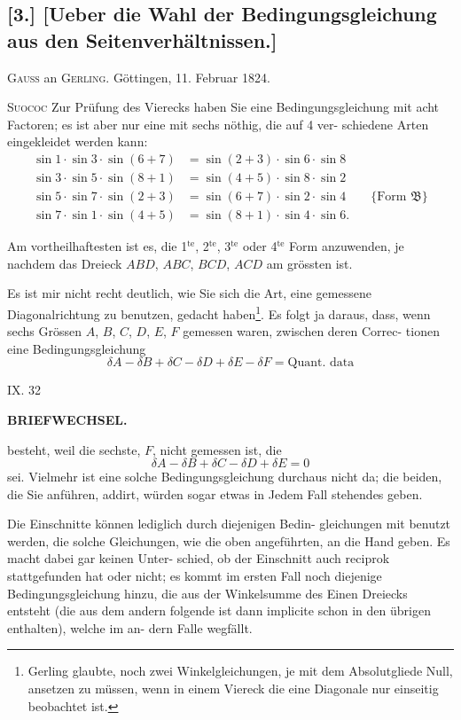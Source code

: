 \documentclass[12pt,a4paper]{article}
\theoremstyle{plain}
\theoremstyle{definition}
\theoremstyle{remark}
\begin{document}
\subsection*{[3.] [Ueber die Wahl der Bedingungsgleichung aus den Seitenverh\"altnissen.]}

\textsc{Gauss} an \textsc{Gerling}. G\"ottingen, 11. Februar 1824.

\medskip

\textsc{Suococ} Zur Pr\"ufung des Vierecks haben Sie eine Bedingungsgleichung
mit acht Factoren; es ist aber nur eine mit sechs n\"othig, die auf 4 ver-
schiedene Arten eingekleidet werden kann:
\begin{align*}
\sin 1 \cdot \sin 3 \cdot \sin(6 + 7) &= \sin(2 + 3) \cdot \sin 6 \cdot \sin 8 \\
\sin 3 \cdot \sin 5 \cdot \sin(8 + 1) &= \sin(4 + 5) \cdot \sin 8 \cdot \sin 2 \\
\sin 5 \cdot \sin 7 \cdot \sin(2 + 3) &= \sin(6 + 7) \cdot \sin 2 \cdot \sin 4 \qquad \{\text{Form }\mathfrak{B}\} \\
\sin 7 \cdot \sin 1 \cdot \sin(4 + 5) &= \sin(8 + 1) \cdot \sin 4 \cdot \sin 6.
\end{align*}

Am vortheilhaftesten ist es, die 1$^{\text{te}}$, 2$^{\text{te}}$, 3$^{\text{te}}$ oder 4$^{\text{te}}$ Form anzuwenden,
je nachdem das Dreieck $ABD$, $ABC$, $BCD$, $ACD$ am gr\"ossten ist.

Es ist mir nicht recht deutlich, wie Sie sich die Art, eine gemessene
Diagonalrichtung zu benutzen, gedacht haben\footnote{Gerling glaubte, noch zwei Winkelgleichungen, je mit dem Absolutgliede Null, ansetzen zu
m\"ussen, wenn in einem Viereck die eine Diagonale nur einseitig beobachtet ist.}.
Es folgt ja daraus, dass,
wenn sechs Gr\"ossen $A$, $B$, $C$, $D$, $E$, $F$ gemessen waren, zwischen deren Correc-
tionen eine Bedingungsgleichung
\[
\delta A - \delta B + \delta C - \delta D + \delta E - \delta F = \text{Quant. data}
\]

\hfill IX. 32


\newpage

\noindent\textbf{BRIEFWECHSEL.}

besteht, weil die sechste, $F$, nicht gemessen ist, die
\[
\delta A - \delta B + \delta C - \delta D + \delta E = 0
\]
sei. Vielmehr ist eine solche Bedingungsgleichung durchaus
nicht da; die beiden, die Sie anf\"uhren, addirt, w\"urden sogar etwas in
Jedem Fall stehendes geben.

Die Einschnitte k\"onnen lediglich durch diejenigen Bedin-
gleichungen mit benutzt werden, die solche Gleichungen, wie die oben
angef\"uhrten, an die Hand geben. Es macht dabei gar keinen Unter-
schied, ob der Einschnitt auch reciprok stattgefunden hat oder nicht; es
kommt im ersten Fall noch diejenige Bedingungsgleichung hinzu, die
aus der Winkelsumme des Einen Dreiecks entsteht (die aus dem andern
folgende ist dann implicite schon in den \"ubrigen enthalten), welche im an-
dern Falle wegf\"allt.
\end{document}
